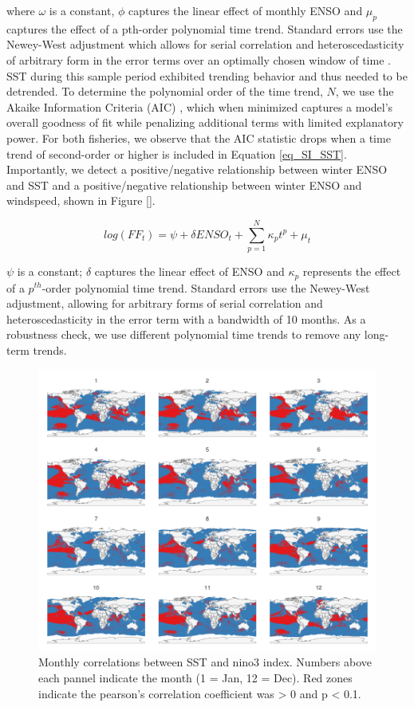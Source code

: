 \documentclass[11pt]{article}
\begin{document}
\noindent where $\omega$ is a constant, $\phi$ captures the linear effect of monthly ENSO and $\mu_{p}$ captures the effect of a pth-order polynomial time trend. Standard errors use the Newey-West adjustment which allows for serial correlation and heteroscedasticity of arbitrary form in the error terms over an optimally chosen window of time \cite{Newey:1987, Newey:1994}. SST during this sample period exhibited trending behavior and thus needed to be detrended. To determine the polynomial order of the time trend, $N$, we use the Akaike Information Criteria (AIC) \cite{Akaike:1974}, which when minimized captures a model's overall goodness of fit while penalizing additional terms with limited explanatory power. For both fisheries, we observe that the AIC statistic drops when a time trend of second-order or higher is included in Equation \ref{eq_SI_SST}. Importantly, we detect a positive/negative relationship between winter ENSO and SST and a positive/negative relationship between winter ENSO and windspeed, shown in Figure \ref{}.

\begin{equation}
\label{eq_T}
log(FF_{t}) = \psi + \delta ENSO_{t} + \sum_{p=1}^{N} \kappa_{p} t^p + \mu_{t}
\end{equation}

\noindent $\psi$ is a constant; $\delta$ captures the linear effect of ENSO and $\kappa_{p}$ represents the effect of a $p^{th}$-order polynomial time trend. Standard errors use the Newey-West adjustment, allowing for arbitrary forms of serial correlation and heteroscedasticity in the error term with a bandwidth of 10 months. As a robustness check, we use different polynomial time trends to remove any long-term trends.

\begin{figure}
\centering
\includegraphics{img/cor_sst_nino34.pdf}
\caption{Monthly correlations between SST and nino3 index. Numbers above each pannel indicate the month (1 = Jan, 12 = Dec).
Red zones indicate the pearson's correlation coefficient was \textgreater{} 0 and p \textless{} 0.1.}
\end{figure}
\end{document}
